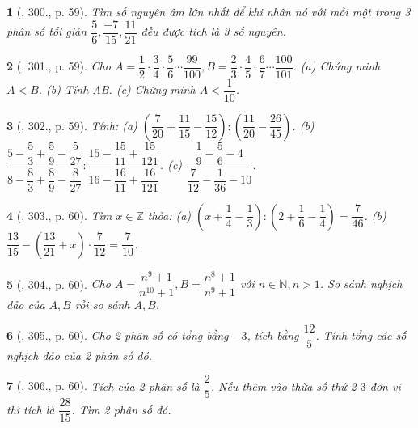 \documentclass{article}
\newtheorem{baitoan}{}
\begin{document}
\begin{baitoan}[\cite{Tuyen_Toan_6}, 300., p. 59]
	Tìm số nguyên âm lớn nhất để khi nhân nó với mỗi một trong 3 phân số tối giản $\dfrac{5}{6},\dfrac{-7}{15},\dfrac{11}{21}$ đều được tích là 3 số nguyên.
\end{baitoan}

\begin{baitoan}[\cite{Tuyen_Toan_6}, 301., p. 59]
	Cho $A = \dfrac{1}{2}\cdot\dfrac{3}{4}\cdot\dfrac{5}{6}\cdots\dfrac{99}{100},B = \dfrac{2}{3}\cdot\dfrac{4}{5}\cdot\dfrac{6}{7}\cdots\dfrac{100}{101}$. (a) Chứng minh $A < B$. (b) Tính AB. (c) Chứng minh $A < \dfrac{1}{10}$.
\end{baitoan}

\begin{baitoan}[\cite{Tuyen_Toan_6}, 302., p. 59]
	Tính: (a) $\left(\dfrac{7}{20} + \dfrac{11}{15} - \dfrac{15}{12}\right):\left(\dfrac{11}{20} - \dfrac{26}{45}\right)$. (b) $\dfrac{5 - \dfrac{5}{3} + \dfrac{5}{9} - \dfrac{5}{27}}{8 - \dfrac{8}{3} + \dfrac{8}{9} - \dfrac{8}{27}}:\dfrac{15 - \dfrac{15}{11} + \dfrac{15}{121}}{16 - \dfrac{16}{11} + \dfrac{16}{121}}$. (c) $\dfrac{\dfrac{1}{9} - \dfrac{5}{6} - 4}{\dfrac{7}{12} - \dfrac{1}{36} - 10}$.
\end{baitoan}

\begin{baitoan}[\cite{Tuyen_Toan_6}, 303., p. 60]
	Tìm $x\in\mathbb{Z}$ thỏa: (a) $\left(x + \dfrac{1}{4} - \dfrac{1}{3}\right):\left(2 + \dfrac{1}{6} - \dfrac{1}{4}\right) = \dfrac{7}{46}$. (b) $\dfrac{13}{15} - \left(\dfrac{13}{21} + x\right)\cdot\dfrac{7}{12} = \dfrac{7}{10}$.
\end{baitoan}

\begin{baitoan}[\cite{Tuyen_Toan_6}, 304., p. 60]
	Cho $A = \dfrac{n^9 + 1}{n^{10} + 1},B = \dfrac{n^8 + 1}{n^9 + 1}$ với $n\in\mathbb{N},n > 1$. So sánh nghịch đảo của $A,B$ rồi so sánh $A,B$.
\end{baitoan}

\begin{baitoan}[\cite{Tuyen_Toan_6}, 305., p. 60]
	Cho 2 phân số có tổng bằng $-3$, tích bằng $\dfrac{12}{5}$. Tính tổng các số nghịch đảo của 2 phân số đó.
\end{baitoan}

\begin{baitoan}[\cite{Tuyen_Toan_6}, 306., p. 60]
	Tích của 2 phân số là $\dfrac{2}{5}$. Nếu thêm vào thừa số thứ 2 $3$ đơn vị thì tích là $\dfrac{28}{15}$. Tìm 2 phân số đó.
\end{baitoan}
\end{document}
